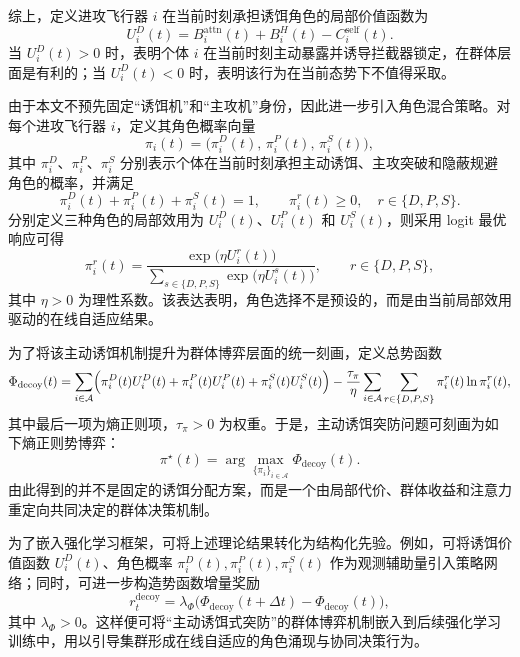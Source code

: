 综上，定义进攻飞行器 $i$ 在当前时刻承担诱饵角色的局部价值函数为
\begin{equation}
U_i^{D}(t)
=
B_i^{\mathrm{attn}}(t)
+
B_i^{H}(t)
-
C_i^{\mathrm{self}}(t).
\end{equation}
当 $U_i^{D}(t)>0$ 时，表明个体 $i$ 在当前时刻主动暴露并诱导拦截器锁定，在群体层面是有利的；当 $U_i^{D}(t)<0$ 时，表明该行为在当前态势下不值得采取。

由于本文不预先固定“诱饵机”和“主攻机”身份，因此进一步引入角色混合策略。对每个进攻飞行器 $i$，定义其角色概率向量
\begin{equation}
\pi_i(t)=
\bigl(
\pi_i^{D}(t),\,
\pi_i^{P}(t),\,
\pi_i^{S}(t)
\bigr),
\end{equation}
其中 $\pi_i^{D}$、$\pi_i^{P}$、$\pi_i^{S}$ 分别表示个体在当前时刻承担主动诱饵、主攻突破和隐蔽规避角色的概率，并满足
\begin{equation}
\pi_i^{D}(t)+\pi_i^{P}(t)+\pi_i^{S}(t)=1,\qquad
\pi_i^{r}(t)\ge 0,\quad r\in\{D,P,S\}.
\end{equation}
分别定义三种角色的局部效用为 $U_i^{D}(t)$、$U_i^{P}(t)$ 和 $U_i^{S}(t)$，则采用 logit 最优响应可得
\begin{equation}
\pi_i^{r}(t)
=
\frac{\exp\!\bigl(\eta U_i^{r}(t)\bigr)}
{\sum\limits_{s\in\{D,P,S\}}\exp\!\bigl(\eta U_i^{s}(t)\bigr)},
\qquad r\in\{D,P,S\},
\end{equation}
其中 $\eta>0$ 为理性系数。该表达表明，角色选择不是预设的，而是由当前局部效用驱动的在线自适应结果。

为了将该主动诱饵机制提升为群体博弈层面的统一刻画，定义总势函数
\begin{equation}
\Phi_{\mathrm{decoy}}(t)
=
\sum_{i\in\mathcal{A}}
\Bigl(
\pi_i^{D}(t)U_i^{D}(t)
+
\pi_i^{P}(t)U_i^{P}(t)
+
\pi_i^{S}(t)U_i^{S}(t)
\Bigr)
-
\frac{\tau_{\pi}}{\eta}
\sum_{i\in\mathcal{A}}
\sum_{r\in\{D,P,S\}}
\pi_i^{r}(t)\ln \pi_i^{r}(t),
\end{equation}
其中最后一项为熵正则项，$\tau_{\pi}>0$ 为权重。于是，主动诱饵突防问题可刻画为如下熵正则势博弈：
\begin{equation}
\pi^{\star}(t)
=
\arg\max_{\{\pi_i\}_{i\in\mathcal{A}}}
\Phi_{\mathrm{decoy}}(t).
\end{equation}
由此得到的并不是固定的诱饵分配方案，而是一个由局部代价、群体收益和注意力重定向共同决定的群体决策机制。

为了嵌入强化学习框架，可将上述理论结果转化为结构化先验。例如，可将诱饵价值函数 $U_i^{D}(t)$、角色概率 $\pi_i^{D}(t),\pi_i^{P}(t),\pi_i^{S}(t)$ 作为观测辅助量引入策略网络；同时，可进一步构造势函数增量奖励
\begin{equation}
r_t^{\mathrm{decoy}}
=
\lambda_{\Phi}
\bigl(
\Phi_{\mathrm{decoy}}(t+\Delta t)-\Phi_{\mathrm{decoy}}(t)
\bigr),
\end{equation}
其中 $\lambda_{\Phi}>0$。这样便可将“主动诱饵式突防”的群体博弈机制嵌入到后续强化学习训练中，用以引导集群形成在线自适应的角色涌现与协同决策行为。

